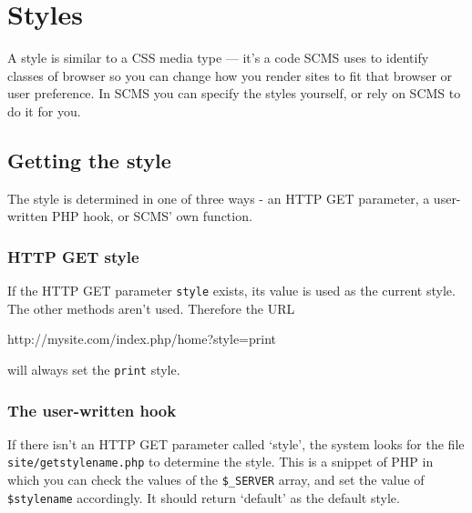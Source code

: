 %
%
%
%
%
%
% 
%
% 
% 
%

\chapter{Styles}
\label{styles}
A style is similar to a CSS media type --- it's a code SCMS uses to identify classes of
browser so you can change how you render sites to fit that browser or user preference.
In SCMS you can specify the styles yourself, or rely on SCMS to do it for you.

\section{Getting the style}
The style is determined in one of three ways - an HTTP GET parameter, a user-written PHP hook,
or SCMS' own function.

\subsection{HTTP GET style}
If the HTTP GET parameter \texttt{style} exists, its value is used as the current style.
The other methods aren't used. Therefore the URL
\begin{MyVerbatim}
http://mysite.com/index.php/home?style=print
\end{MyVerbatim}
will always set the \texttt{print} style.

\subsection{The user-written hook}
If there isn't an HTTP GET parameter called `style', the system looks for the file \texttt{site/getstylename.php}
to determine the style. This is a snippet of PHP in which you can check the values of the
\texttt{\$\_SERVER} array, and set the value of \texttt{\$stylename} accordingly. It should
return `default' as the default style.


